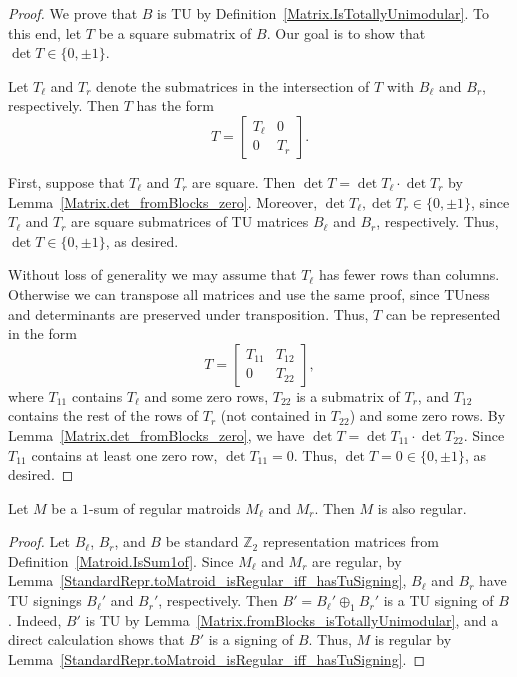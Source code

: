 \begin{proof}
    \leanok
    We prove that $B$ is TU by Definition~\ref{Matrix.IsTotallyUnimodular}. To this end, let $T$ be a square submatrix of $B$. Our goal is to show that $\det T \in \{0, \pm 1\}$.

    Let $T_{\ell}$ and $T_{r}$ denote the submatrices in the intersection of $T$ with $B_{\ell}$ and $B_{r}$, respectively. Then $T$ has the form
    \[
        T = \begin{bmatrix} T_{\ell} & 0 \\ 0 & T_{r} \end{bmatrix}.
    \]

    First, suppose that $T_{\ell}$ and $T_{r}$ are square. Then $\det T = \det T_{\ell} \cdot \det T_{r}$ by Lemma~\ref{Matrix.det_fromBlocks_zero}. Moreover, $\det T_{\ell}, \det T_{r} \in \{0, \pm 1\}$, since $T_{\ell}$ and $T_{r}$ are square submatrices of TU matrices $B_{\ell}$ and $B_{r}$, respectively. Thus, $\det T \in \{0, \pm 1\}$, as desired.

    Without loss of generality we may assume that $T_{\ell}$ has fewer rows than columns. Otherwise we can transpose all matrices and use the same proof, since TUness and determinants are preserved under transposition. Thus, $T$ can be represented in the form
    \[
        T = \begin{bmatrix} T_{11} & T_{12} \\ 0 & T_{22} \end{bmatrix},
    \]
    where $T_{11}$ contains $T_{\ell}$ and some zero rows, $T_{22}$ is a submatrix of $T_{r}$, and $T_{12}$ contains the rest of the rows of $T_{r}$ (not contained in $T_{22}$) and some zero rows. By Lemma~\ref{Matrix.det_fromBlocks_zero}, we have $\det T = \det T_{11} \cdot \det T_{22}$. Since $T_{11}$ contains at least one zero row, $\det T_{11} = 0$. Thus, $\det T = 0 \in \{0, \pm 1\}$, as desired.
\end{proof}

\begin{theorem}
    \label{Matroid.IsSum1of.isRegular}
    \leanok
    Let $M$ be a $1$-sum of regular matroids $M_{\ell}$ and $M_{r}$. Then $M$ is also regular.
\end{theorem}

\begin{proof}
    \leanok
    Let $B_{\ell}$, $B_{r}$, and $B$ be standard $\mathbb{Z}_{2}$ representation matrices from Definition~\ref{Matroid.IsSum1of}. Since $M_{\ell}$ and $M_{r}$ are regular, by Lemma~\ref{StandardRepr.toMatroid_isRegular_iff_hasTuSigning}, $B_{\ell}$ and $B_{r}$ have TU signings $B_{\ell}'$ and $B_{r}'$, respectively. Then $B' = B_{\ell}' \oplus_{1} B_{r}'$ is a TU signing of $B$. Indeed, $B'$ is TU by Lemma~\ref{Matrix.fromBlocks_isTotallyUnimodular}, and a direct calculation shows that $B'$ is a signing of $B$. Thus, $M$ is regular by Lemma~\ref{StandardRepr.toMatroid_isRegular_iff_hasTuSigning}.
\end{proof}
